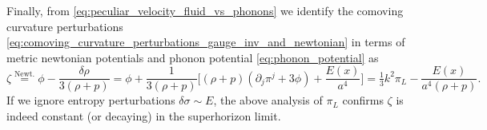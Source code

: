 Finally, from \eqref{eq:peculiar_velocity_fluid_vs_phonons} we identify the comoving curvature perturbations \eqref{eq:comoving_curvature_perturbations_gauge_inv_and_newtonian} in terms of metric newtonian potentials and phonon potential \eqref{eq:phonon_potential} as
\begin{equation}
    \zeta \overset{\text{Newt.}}{=} \phi -\frac{\delta\rho}{3(\rho+p)} = \phi + \frac{1}{3(\rho+p)}\bigg[(\rho+p)(\partial_j\pi^j+3\phi)+\frac{E(x)}{a^4}\bigg]=\tfrac13 k^2\pi_L-\frac{E(x)}{a^4(\rho+p)}.
\end{equation}
If we ignore entropy perturbations $\delta\sigma\sim E$, the above analysis of $\pi_L$ confirms $\zeta$ is indeed constant (or decaying) in the superhorizon limit.










